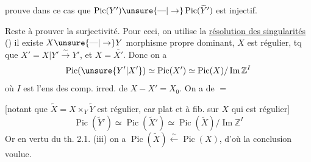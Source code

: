  prouve dans ce cas que $\operatorname{Pic}(Y')\unsure{\text{---}|\to}\operatorname{Pic}(\widetilde Y')$ est injectif.

Reste à prouver la surjectivité. Pour ceci, on utilise la \uline{résolution des singularités} () il existe $X\unsure{\text{---}|\to}Y$ morphisme propre dominant, $X$ est régulier, tq que $X'=X|Y'\overset{\sim}{\longrightarrow}Y'$, et $X=\overline{X'}$. Donc on a
\[
\operatorname{Pic}(\unsure{Y'|X'})\simeq\operatorname{Pic}(X')\simeq\operatorname{Pic}(X)/\operatorname{Im}\mathbb Z^I
\]
où $I$ est l'ens des comp. irred. de $X-X'=X_0$. On a de $=$

[notant que $\widetilde X=X\times_Y\widetilde Y$ est régulier, car plat et  à fib.  sur $X$ qui est régulier]
\[
\operatorname{Pic}(\widetilde Y')\simeq\operatorname{Pic}(\widetilde X')\simeq\operatorname{Pic}(\widetilde X)/\operatorname{Im}\mathbb Z^I
\]
Or en vertu du th. 2.1. (iii) on a $\operatorname{Pic}(\widetilde X)\overset{\sim}{\longleftarrow}\operatorname{Pic}(X)$, d'où la conclusion voulue.

